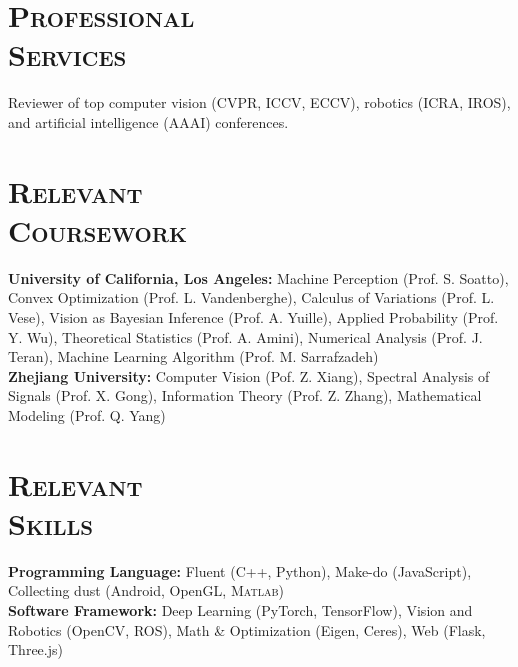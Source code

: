 \documentclass[margin, line, 10pt]{res} %
\begin{document}
\begin{resume}
\section{\textsc{Professional\\Services}}
Reviewer of top computer vision (CVPR, ICCV, ECCV), robotics (ICRA, IROS), and artificial intelligence (AAAI) conferences.



\section{\textsc{Relevant\\Coursework}}
\textbf{University of California, Los Angeles:} Machine Perception (Prof. S. Soatto), Convex Optimization (Prof. L. Vandenberghe), Calculus of Variations (Prof. L. Vese), Vision as Bayesian Inference (Prof. A. Yuille), Applied Probability (Prof. Y. Wu), Theoretical Statistics (Prof. A. Amini), Numerical Analysis (Prof. J. Teran), Machine Learning Algorithm (Prof. M. Sarrafzadeh)\\
\textbf{Zhejiang University:} Computer Vision (Pof. Z. Xiang), Spectral Analysis of Signals (Prof. X. Gong), Information Theory (Prof. Z. Zhang), Mathematical Modeling (Prof. Q. Yang)

\section{\textsc{Relevant\\Skills}}
\textbf{Programming Language:} Fluent (C++, Python), Make-do (JavaScript), Collecting dust (Android, OpenGL, \textsc{Matlab})\\
\textbf{Software Framework:} Deep Learning (PyTorch, TensorFlow), Vision and Robotics (OpenCV, ROS), Math \& Optimization (Eigen, Ceres), Web (Flask, Three.js)


\end{resume}
\end{document}
